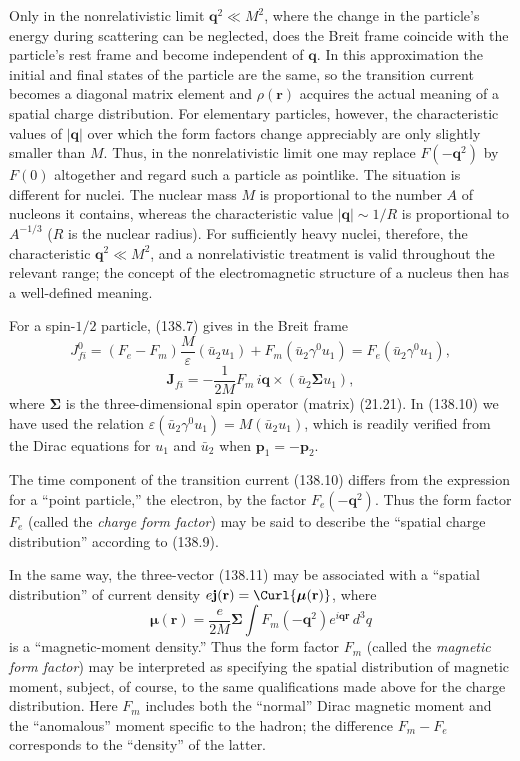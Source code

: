 Only in the nonrelativistic limit $\mathbf q^2\ll M^2$, where the change in the particle's energy during scattering can be neglected, does the Breit frame coincide with the particle's rest frame and become independent
of $\mathbf q$. In this approximation the initial and final states of the particle are the same, so the transition current becomes a diagonal matrix element and $\rho(\mathbf r)$ acquires the actual meaning of a spatial charge distribution. For elementary particles, however, the characteristic values of $|\mathbf q|$ over which the form factors change appreciably are only slightly smaller than $M$. Thus, in the nonrelativistic limit one may replace $F(-\mathbf q^2)$ by $F(0)$ altogether and regard such a particle as pointlike. The situation is different for nuclei. The nuclear mass $M$ is proportional to the number $A$ of nucleons it contains, whereas the characteristic value $|\mathbf q|\sim1/R$ is proportional to $A^{-1/3}$ ($R$ is the nuclear radius). For sufficiently heavy nuclei, therefore, the characteristic $\mathbf q^2\ll M^2$, and a nonrelativistic treatment is valid throughout the relevant range; the concept of the electromagnetic structure of a nucleus then has a well-defined meaning.

For a spin-$1/2$ particle, (138.7) gives in the Breit frame
\begin{equation}
J_{fi}^0=(F_e-F_m)\frac{M}{\varepsilon}(\bar u_2u_1)
+F_m(\bar u_2\gamma^0u_1)=F_e(\bar u_2\gamma^0u_1),
\tag{138.10}
\end{equation}
\begin{equation}
\mathbf J_{fi}=-\frac{1}{2M}F_m\,i\mathbf q\times(\bar u_2\boldsymbol\Sigma u_1),
\tag{138.11}
\end{equation}
where $\boldsymbol\Sigma$ is the three-dimensional spin operator (matrix) (21.21). In (138.10) we have used the relation $\varepsilon(\bar u_2\gamma^0u_1)=M(\bar u_2u_1)$, which is readily verified from the Dirac equations for $u_1$ and $\bar u_2$ when $\mathbf p_1=-\mathbf p_2$.

The time component of the transition current (138.10) differs from the expression for a ``point particle,'' the electron, by the factor $F_e(-\mathbf q^2)$. Thus the form factor $F_e$ (called the \emph{charge form factor}) may be said to describe the ``spatial charge distribution'' according to (138.9).

In the same way, the three-vector (138.11) may be associated with a ``spatial distribution'' of current density $e\mathbf j(\mathbf r)=\Curl{\boldsymbol\mu(\mathbf r)}$, where
\[
\boldsymbol\mu(\mathbf r)=\frac{e}{2M}\boldsymbol\Sigma
\int F_m(-\mathbf q^2)e^{i\mathbf q\mathbf r}\,d^3q
\]
is a ``magnetic-moment density.'' Thus the form factor $F_m$ (called the \emph{magnetic form factor}) may be interpreted as specifying the spatial distribution of magnetic moment, subject, of course, to the same qualifications made above for the charge distribution. Here $F_m$ includes both the ``normal'' Dirac magnetic moment and the ``anomalous'' moment specific to the hadron; the difference $F_m-F_e$ corresponds to the ``density'' of the latter.

